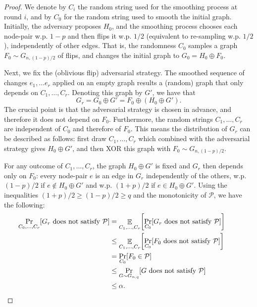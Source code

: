 \documentclass[letter,11pt]{article}
\begin{document}
\begin{proof}
    We denote by $C_i$ the random string used for the smoothing process at round $i$, and by $C_0$ for the random string used to smooth the initial graph.
    Initially, the adversary proposes $H_0$, and the smoothing process chooses each node-pair w.p. $1-p$ and then flips it w.p. $1/2$ (equivalent to re-sampling w.p. $1/2$), independently of other edges.
    That is, the randomness $C_0$ samples a graph $F_0 \sim G_{n,(1-p)/2}$ of flips, and changes the initial graph to $G_0 = H_0 \oplus F_0$.

    Next, we fix the (oblivious flip) adversarial strategy. The smoothed sequence of changes $e_1,\dots e_r$ applied on an empty graph results a (random) graph that only depends on $C_1, \dots, C_r$. Denoting this graph by $G'$, we have that 
    \[
        G_r = G_0 \oplus G' = F_0 \oplus \left(H_0 \oplus G'\right) .
    \]
    The crucial point is that the adversarial strategy is chosen in advance, and therefore it does not depend on $F_0$. Furthermore, the random strings $C_1,\dots, C_r$ are independent of $C_0$ and therefore of $F_0$.
    This means the distribution of $G_r$ can be described as follows: first draw $C_1,\dots, C_r$ which combined with the adversarial strategy gives $H_0 \oplus G'$, and then XOR this graph with $F_0 \sim G_{n,(1-p)/2}$.

    For any outcome of $C_1, \dots, C_r$, the graph $H_0 \oplus G'$ is fixed and $G_r$ then depends only on $F_0$: every node-pair $e$ is an edge in $G_r$ independently of the others, w.p. $(1-p)/2$ if $e \notin H_0 \oplus G'$ and w.p. $(1+p)/2$ if $e \in H_0 \oplus G'$.
    Using the inequalities $(1+p)/2 \geq (1-p)/2 \geq q$ and the monotonicity of $\mathcal{P}$, we have the following: 
    \[
    \begin{aligned}
        \Prob{C_0,\dots,C_r}{G_r \textnormal{ does not satisfy }\mathcal{P}}
        &= \Expc{C_1,\dots,C_r}{\Prob{C_0}{G_r \textnormal{ does not satisfy }\mathcal{P}}}\\
        &\leq \Expc{C_1,\dots,C_r}{\Prob{C_0}{F_0 \textnormal{ does not satisfy }\mathcal{P}}}\\
       &= \Prob{C_0}{F_0 \in \mathcal{P}}\\
        &\leq \Prob{G\sim G_{n,q}}{G \textnormal{ does not satisfy }\mathcal{P}} \\
        &\leq \alpha. &&\qedhere
    \end{aligned}
    \]
\end{proof}
\end{document}
